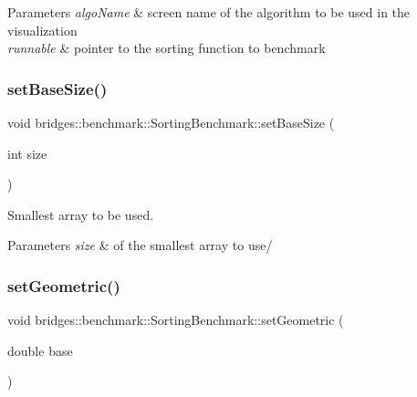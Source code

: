 \begin{DoxyParams}{Parameters}
{\em algo\+Name} & screen name of the algorithm to be used in the visualization \\
\hline
{\em runnable} & pointer to the sorting function to benchmark \\
\hline
\end{DoxyParams}
\mbox{\label{classbridges_1_1benchmark_1_1_sorting_benchmark_afe0474d148c185ed1e479ff11f42ae51}} 
\subsubsection{\texorpdfstring{setBaseSize()}{setBaseSize()}}
{\footnotesize\ttfamily void bridges\+::benchmark\+::\+Sorting\+Benchmark\+::set\+Base\+Size (\begin{DoxyParamCaption}\item[{int}]{size }\end{DoxyParamCaption})\hspace{0.3cm}{\ttfamily [inline]}}



Smallest array to be used. 


\begin{DoxyParams}{Parameters}
{\em size} & of the smallest array to use/ \\
\hline
\end{DoxyParams}
\mbox{\label{classbridges_1_1benchmark_1_1_sorting_benchmark_ade76a5749b07d35b02623cce27c046ab}} 
\subsubsection{\texorpdfstring{setGeometric()}{setGeometric()}}
{\footnotesize\ttfamily void bridges\+::benchmark\+::\+Sorting\+Benchmark\+::set\+Geometric (\begin{DoxyParamCaption}\item[{double}]{base }\end{DoxyParamCaption})\hspace{0.3cm}{\ttfamily [inline]}}



